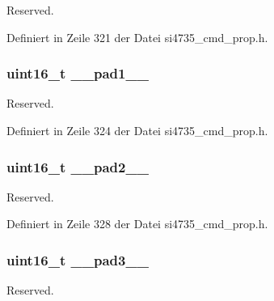 Reserved. 



Definiert in Zeile 321 der Datei si4735\+\_\+cmd\+\_\+prop.\+h.

\hypertarget{uniongpo__ien_ab72e3a1f2f7db8695c60c658f5a0f11a}{}
\subsubsection[{\+\_\+\+\_\+pad1\+\_\+\+\_\+}]{\setlength{\rightskip}{0pt plus 5cm}uint16\+\_\+t \+\_\+\+\_\+pad1\+\_\+\+\_\+}\label{uniongpo__ien_ab72e3a1f2f7db8695c60c658f5a0f11a}


Reserved. 



Definiert in Zeile 324 der Datei si4735\+\_\+cmd\+\_\+prop.\+h.

\hypertarget{uniongpo__ien_a82701c5ec65a0fca9a84d8edc46a8192}{}
\subsubsection[{\+\_\+\+\_\+pad2\+\_\+\+\_\+}]{\setlength{\rightskip}{0pt plus 5cm}uint16\+\_\+t \+\_\+\+\_\+pad2\+\_\+\+\_\+}\label{uniongpo__ien_a82701c5ec65a0fca9a84d8edc46a8192}


Reserved. 



Definiert in Zeile 328 der Datei si4735\+\_\+cmd\+\_\+prop.\+h.

\hypertarget{uniongpo__ien_a1b0a1a9de051f3174325808d959500f7}{}
\subsubsection[{\+\_\+\+\_\+pad3\+\_\+\+\_\+}]{\setlength{\rightskip}{0pt plus 5cm}uint16\+\_\+t \+\_\+\+\_\+pad3\+\_\+\+\_\+}\label{uniongpo__ien_a1b0a1a9de051f3174325808d959500f7}


Reserved. 




